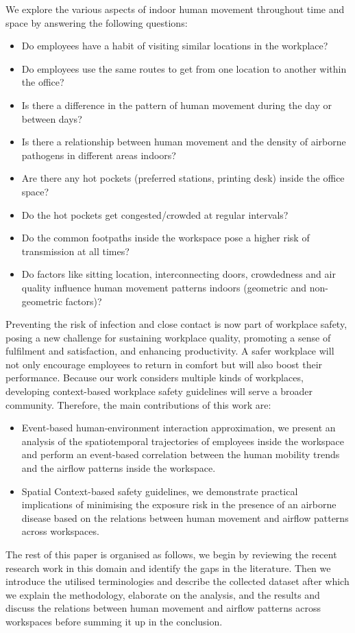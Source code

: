 \documentclass[acmtog]{acmart}
\begin{document}
We explore the various aspects of indoor human movement throughout time and space by answering the following questions:

\begin{itemize}
    \item Do employees have a habit of visiting similar locations in the workplace?
    \item Do employees use the same routes to get from one location to another within the office?
    \item Is there a difference in the pattern of human movement during the day or between days?
    \item Is there a relationship between human movement and the density of airborne pathogens in different areas indoors?
    \item Are there any hot pockets (preferred stations, printing desk) inside the office space?
    \item Do the hot pockets get congested/crowded at regular intervals?
    \item Do the common footpaths inside the workspace pose a higher risk of transmission at all times?
    \item Do factors like sitting location, interconnecting doors, crowdedness and air quality influence human movement patterns indoors (geometric and non-geometric factors)?
\end{itemize}



Preventing the risk of infection and close contact is now part of workplace safety, posing a new challenge for sustaining workplace quality, promoting a sense of fulfilment and satisfaction, and enhancing productivity. A safer workplace will not only encourage employees to return in comfort but will also boost their performance. Because our work considers multiple kinds of workplaces, developing context-based workplace safety guidelines will serve a broader community. Therefore, the main contributions of this work are:
\begin{itemize}
    \item Event-based human-environment interaction approximation, we present an analysis of the spatiotemporal trajectories of employees inside the workspace and perform an event-based correlation between the human mobility trends and the airflow patterns inside the workspace.
    \item Spatial Context-based safety guidelines, we demonstrate practical implications of minimising the exposure risk in the presence of an airborne disease based on the relations between human movement and airflow patterns across workspaces.

\end{itemize}
The rest of this paper is organised as follows, we begin by reviewing the recent research work in this domain and identify the gaps in the literature. Then we introduce the utilised terminologies and describe the collected dataset after which we explain the methodology, elaborate on the analysis, and the results and discuss the relations between human movement and airflow patterns across workspaces before summing it up in the conclusion.
\end{document}
